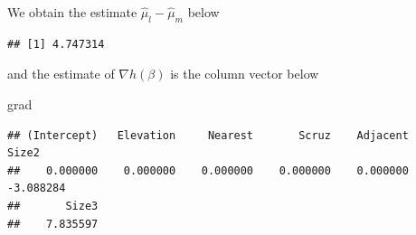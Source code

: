 \documentclass[
  ignorenonframetext,
]{beamer}
\newenvironment{Shaded}{\begin{snugshade}}{\end{snugshade}}
\newcommand{\DecValTok}[1]{\textcolor[rgb]{0.00,0.00,0.81}{#1}}
\newcommand{\FunctionTok}[1]{\textcolor[rgb]{0.00,0.00,0.00}{#1}}
\newcommand{\NormalTok}[1]{#1}
\newcommand{\OtherTok}[1]{\textcolor[rgb]{0.56,0.35,0.01}{#1}}
\newcommand{\SpecialCharTok}[1]{\textcolor[rgb]{0.00,0.00,0.00}{#1}}
\begin{document}
\begin{frame}[fragile]{}
\protect\hypertarget{section-16}{}
We obtain the estimate \(\hat\mu_l - \hat\mu_m\) below

\vspace{12pt}
\tiny

\begin{Shaded}
\end{Shaded}

\begin{verbatim}
## [1] 4.747314
\end{verbatim}

\vspace{12pt}
\normalsize

and the estimate of \(\nabla h(\beta)\) is the column vector below

\vspace{12pt}
\tiny

\begin{Shaded}
\begin{Highlighting}[]
\NormalTok{grad}
\end{Highlighting}
\end{Shaded}

\begin{verbatim}
## (Intercept)   Elevation     Nearest       Scruz    Adjacent       Size2 
##    0.000000    0.000000    0.000000    0.000000    0.000000   -3.088284 
##       Size3 
##    7.835597
\end{verbatim}
\end{frame}
\end{document}
